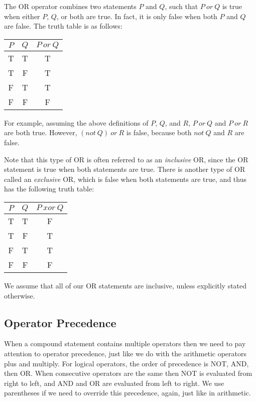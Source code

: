 \documentclass[letterpaper,12pt,fleqn]{article}
\begin{document}
The OR operator combines two statements $P$ and $Q$, such that $P\ or\ Q$ is
true when either $P$, $Q$, or both are true. In fact, it is only false when
both $P$ and $Q$ are false. The truth table is as follows:

\begin{tabular}{|cc|c|}
\hline
$P$ & $Q$ & $P\ or\ Q$ \\
\hline
T & T & T \\
\hline
T & F & T \\
\hline
F & T & T \\
\hline
F & F & F \\
\hline
\end{tabular}

For example, assuming the above definitions of $P$, $Q$, and $R$, $P\ or\ Q$ and
$P\ or\ R$ are both true. However, $(not\ Q)\ or\ R$ is false, because both
$not\ Q$ and $R$ are false.

Note that this type of OR is often referred to as an \emph{inclusive} OR, since
the OR statement is true when both statements are true. There is another type
of OR called an \emph{exclusive} OR, which is false when both statements are
true, and thus has the following truth table:

\begin{tabular}{|cc|c|}
\hline
$P$ & $Q$ & $P\ xor\ Q$ \\
\hline
T & T & F \\
\hline
T & F & T \\
\hline
F & T & T \\
\hline
F & F & F \\
\hline
\end{tabular}

We assume that all of our OR statements are inclusive, unless explicitly stated
otherwise.

\subsection*{Operator Precedence}

When a compound statement contains multiple operators then we need to pay
attention to operator precedence, just like we do with the arithmetic operators
plus and multiply. For logical operators, the order of precedence is NOT, AND,
then OR. When consecutive operators are the same then NOT is evaluated from
right to left, and AND and OR are evaluated from left to right. We use
parentheses if we need to override this precedence, again, just like in
arithmetic.
\end{document}
